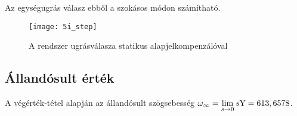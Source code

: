 Az egységugrás válasz ebből a szokásos módon számítható.
\begin{figure}[H]
	\centering
	\texttt{[image: 5i\_step]}
	\caption{A rendszer ugrásválasza statikus alapjelkompenzálóval}
	\label{fig:5i_step}
\end{figure}


\subsection{Állandósult érték}

A végérték-tétel alapján az állandósult szögsebesség $\omega_\infty = \lim\limits_{s\rightarrow 0}s\mathrm{Y} = 613,6578$.


